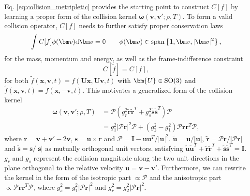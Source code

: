 \documentclass[preprint,1p,times]{elsarticle}
\theoremstyle{definition}
\theoremstyle{remark}
\begin{document}
Eq. \eqref{eq:collision_metripletic} provides the starting point to construct $C[f]$ by learning a proper form of the collision kernel $\bm \omega(\bm v, \bm v'; \rho, T)$. To form a valid collision operator, $C[f]$ needs to further satisfy proper conservation laws 
\begin{equation}
\int C[f] \phi(\bm v) {\rm d}\bm v = 0 \qquad \phi(\bm v) \in {\text {span}} \left \{1, \bm v, \vert \bm v\vert^2\right \},
\label{eq:conservation_law}
\end{equation}
for the mass, momentum and energy, as well as the frame-indifference constraint
\begin{equation}
C[\tilde{f}] = C[f],
\label{eq:frame_indifference}
\end{equation}
for both $\tilde{f}(\bm x, \bm v, t) = f(\bm{U} \bm x, \bm{U}  \bm v, t)$ with $\bm{U} \in {\rm SO}(3)$ and $\tilde{f}(\bm x, \bm v, t) = f(\bm x, -\bm v, t)$.  
This motivates a generalized form of the collision kernel
\begin{equation}
\begin{split} 
    \bm{\omega} (\bm{v}, \bm{v}'; \rho, T) &= \boldsymbol{\mathcal{P}} \left(g_{r}^2 \widetilde{\boldsymbol{r}}\widetilde{\boldsymbol{r}}^T + g_{s}^2 \widetilde{\boldsymbol{s}}\widetilde{\boldsymbol{s}}^T\right) \boldsymbol{\mathcal{P}} \\
    &= g_{1}^{2} |\bm{\mathcal{P}}\bm{r}|^{2} \bm{\mathcal{P}} + (g_{2}^{2}-g_{1}^{2}) \bm{\mathcal{P}} \bm{r} \bm{r}^{T} \bm{\mathcal{P}} ,  
\end{split}\label{eq:kernel_form}    
\end{equation}
where $\boldsymbol{r}=\boldsymbol{v}+\boldsymbol{v}' - 2\bar{\boldsymbol{v}}$, $\boldsymbol{s}=\boldsymbol{u}\times\boldsymbol{r}$ and $\boldsymbol{\mathcal{P}}=\boldsymbol{I}-\boldsymbol{u}\boldsymbol{u}^T/|\boldsymbol{u}|^2$. $\widetilde{\boldsymbol{u}}=\boldsymbol{u}/|\boldsymbol{u}|$, $\widetilde{\boldsymbol{r}}=\boldsymbol{\mathcal{P}}\boldsymbol{r}/|\boldsymbol{\mathcal{P}}\boldsymbol{r}|$ and $\widetilde{\boldsymbol{s}}=\boldsymbol{s}/|\boldsymbol{s}|$ as mutually orthogonal unit vectors, satisfying $\widetilde{\boldsymbol{u}} \widetilde{\boldsymbol{u}}^{T} + \widetilde{\boldsymbol{r}} \widetilde{\boldsymbol{r}}^{T} + \widetilde{\boldsymbol{s}} \widetilde{\boldsymbol{s}}^{T} = \boldsymbol{I}$. $g_r$ and $g_s$ represent the collision magnitude along the two unit directions in the plane orthogonal to the relative velocity $\bm u = \bm v - \bm v'$. Furthermore, we can rewrite the kernel in the form of the isotropic part $\propto \mathcal{P}$ and the anisotropic part $\propto  \mathcal{P} \bm r \bm r^T \mathcal{P}$, where $g_s^2 = g_1^2 \vert \mathcal{P}\boldsymbol{r}\vert^2$ and $g_r^2 = g_2^2 \vert \mathcal{P}\boldsymbol{r}\vert^2$. 
\end{document}
